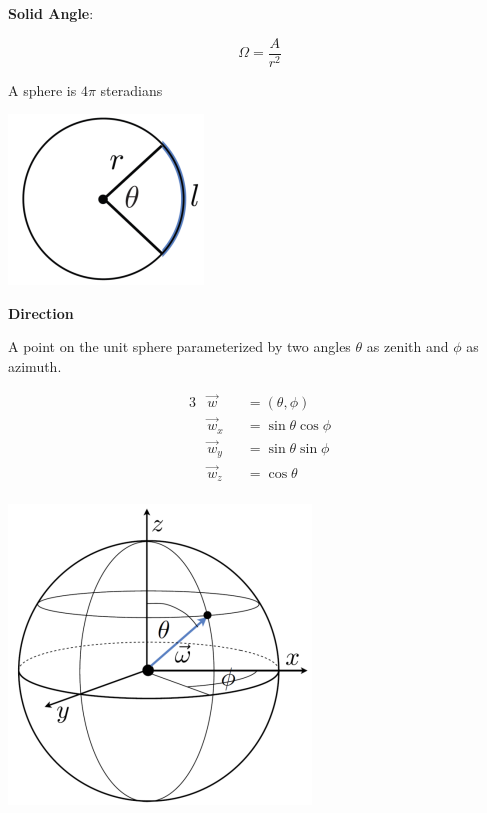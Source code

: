 \documentclass{article}
\begin{document}
\textbf{Solid Angle}:

\begin{minipage}{0.435\textwidth}
    \[
        \Omega = \frac{A}{r^2}
    \]
    \begin{center}
        A sphere is \(4\pi\) steradians
    \end{center}
\end{minipage}
\begin{minipage}{0.435\textwidth}
    \includegraphics[width=0.3\linewidth]{images/radians.png}
\end{minipage}

\textbf{Direction}

\vspace{5px}

A point on the unit sphere parameterized by two angles \(\theta\) as zenith and \(\phi\) as azimuth.


\begin{minipage}{0.6\textwidth}
    \begin{alignat*}{3}
        &\vec{w} &&= (\theta, \phi)\\[5px]
        &\vec{w}_x &&= \sin \theta \cos \phi\\
        &\vec{w}_y &&= \sin \theta \sin \phi\\
        &\vec{w}_z &&= \cos \theta\\ 
    \end{alignat*}
\end{minipage}
\begin{minipage}{0.3\textwidth}
    \includegraphics[width=0.8\linewidth]{images/direction.png}
\end{minipage}
\end{document}
